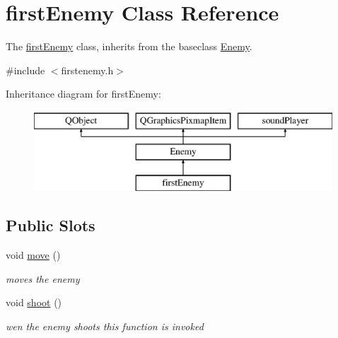 \hypertarget{classfirstEnemy}{}\section{first\+Enemy Class Reference}
\label{classfirstEnemy}


The \hyperlink{classfirstEnemy}{first\+Enemy} class, inherits from the baseclass \hyperlink{classEnemy}{Enemy}.  




{\ttfamily \#include $<$firstenemy.\+h$>$}

Inheritance diagram for first\+Enemy\+:\begin{figure}[H]
\begin{center}
\leavevmode
\includegraphics[height=3.000000cm]{classfirstEnemy}
\end{center}
\end{figure}
\subsection*{Public Slots}
\begin{DoxyCompactItemize}
\item 
\mbox{\label{classfirstEnemy_acfbe192460fb5c355fd16b7defb20076}} 
void \hyperlink{classfirstEnemy_acfbe192460fb5c355fd16b7defb20076}{move} ()
\begin{DoxyCompactList}\small\item\em moves the enemy \end{DoxyCompactList}\item 
\mbox{\label{classfirstEnemy_abb18fa8de737346a07c7c2772edd098c}} 
void \hyperlink{classfirstEnemy_abb18fa8de737346a07c7c2772edd098c}{shoot} ()
\begin{DoxyCompactList}\small\item\em wen the enemy shoots this function is invoked \end{DoxyCompactList}\end{DoxyCompactItemize}
